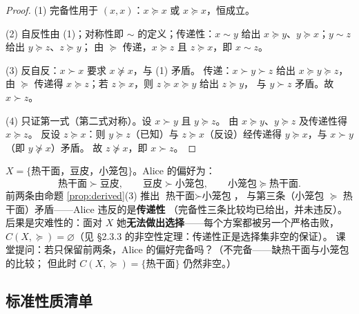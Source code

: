 \begin{proof}
(1) 完备性用于 $(x,x)$：$x\succeq x$ 或 $x\succeq x$，恒成立。

(2) 自反性由 (1)；对称性即 $\sim$ 的定义；传递性：$x\sim y$ 给出
$x\succeq y$、$y\succeq x$；$y\sim z$ 给出 $y\succeq z$、$z\succeq y$；
由 $\succeq$ 传递，$x\succeq z$ 且 $z\succeq x$，即 $x\sim z$。

(3) 反自反：$x\succ x$ 要求 $x\not\succeq x$，与 (1) 矛盾。
传递：$x\succ y\succ z$ 给出 $x\succeq y\succeq z$，由 $\succeq$ 传递得
$x\succeq z$；若 $z\succeq x$，则 $z\succeq x\succeq y$ 给出 $z\succeq y$，
与 $y\succ z$ 矛盾。故 $x\succ z$。

(4) 只证第一式（第二式对称）。设 $x\succ y$ 且 $y\succeq z$。
由 $x\succeq y$、$y\succeq z$ 及传递性得 $x\succeq z$。
反设 $z\succeq x$：则 $y\succeq z$（已知）与 $z\succeq x$（反设）经传递得
$y\succeq x$，与 $x\succ y$（即 $y\not\succeq x$）矛盾。
故 $z\not\succeq x$，即 $x\succ z$。
\end{proof}

\begin{example}\label{ex:alice}
$X=\{$热干面，豆皮，小笼包$\}$。Alice 的偏好为：
\[
\text{热干面}\succ\text{豆皮},\qquad
\text{豆皮}\succ\text{小笼包},\qquad
\text{小笼包}\succeq\text{热干面}.
\]
前两条由命题 \ref{prop:derived}(3) 推出 $\text{热干面}\succ\text{小笼包}$，
与第三条（小笼包 $\succeq$ 热干面）矛盾——Alice 违反的是\textbf{传递性}
（完备性三条比较均已给出，并未违反）。
后果是灾难性的：面对 $X$ 她\textbf{无法做出选择}——每个方案都被另一个严格击败，
$C(X,\succeq)=\varnothing$（见 §2.3.3 的非空性定理：传递性正是选择集非空的保证）。
课堂提问：若只保留前两条，Alice 的偏好完备吗？（不完备——缺热干面与小笼包的比较；
但此时 $C(X,\succeq)=\{$热干面$\}$ 仍然非空。）
\end{example}

\subsection{标准性质清单}

